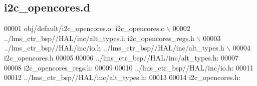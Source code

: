 \subsection{i2c\+\_\+opencores.\+d}
\label{lms__ctr__app_2obj_2default_2i2c__opencores_8d_source}

\begin{DoxyCode}
00001 obj/\textcolor{keywordflow}{default}/i2c\_opencores.o: i2c\_opencores.c \(\backslash\)
00002  ../lms\_ctr\_bsp\textcolor{comment}{//HAL/inc/alt\_types.h i2c\_opencores\_regs.h \(\backslash\)}
00003 \textcolor{comment}{ ../lms\_ctr\_bsp//HAL/inc/io.h ../lms\_ctr\_bsp//HAL/inc/alt\_types.h \(\backslash\)}
00004 \textcolor{comment}{ i2c\_opencores.h}
00005 
00006 ../lms\_ctr\_bsp\textcolor{comment}{//HAL/inc/alt\_types.h:}
00007 
00008 i2c\_opencores\_regs.h:
00009 
00010 ../lms\_ctr\_bsp\textcolor{comment}{//HAL/inc/io.h:}
00011 
00012 ../lms\_ctr\_bsp\textcolor{comment}{//HAL/inc/alt\_types.h:}
00013 
00014 i2c\_opencores.h:
\end{DoxyCode}
